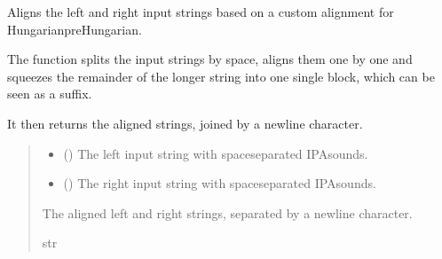 \documentclass[letterpaper,10pt,english]{sphinxmanual}
\begin{document}

\begin{fulllineitems}
\label{\detokenize{documentation:loanpy.scminer.uralign}}
\pysigstartsignatures
{}
\pysigstopsignatures
\sphinxAtStartPar
Aligns the left and right input strings based on a custom alignment
for Hungarian\sphinxhyphen{}preHungarian.

\sphinxAtStartPar
The function splits the input strings by space, aligns them one by one
and squeezes the remainder of the longer string into one single block,
which can be seen as a suffix.

\sphinxAtStartPar
It then returns the aligned strings, joined by a newline character.
\begin{quote}\begin{description}
\begin{itemize}
\item {} 
\sphinxAtStartPar
{} () \textendash{} The left input string with space\sphinxhyphen{}separated IPA\sphinxhyphen{}sounds.

\item {} 
\sphinxAtStartPar
{} () \textendash{} The right input string with space\sphinxhyphen{}separated IPA\sphinxhyphen{}sounds.

\end{itemize}

\sphinxAtStartPar
The aligned left and right strings, separated by
a newline character.

\sphinxAtStartPar
str

\end{description}\end{quote}

\sphinxAtStartPar
{}


\end{fulllineitems}
\end{document}
